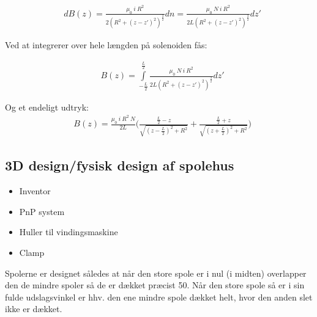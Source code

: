 \begin{align}
	&dB(z)=\frac{\mu_0 \: i \: R^2}{2(R^2+(z-z')^2)^\frac{3}{2}}dn=\frac{\mu_0 \: N \: i \: R^2}{2L(R^2+(z-z')^2)^\frac{3}{2}}dz'
\end{align}

Ved at integrerer over hele længden på solenoiden fås:

\begin{align}
	&B(z)=\int\limits_{-\frac{L}{2}}^{\frac{L}{2}}\frac{\mu_0 \: N \: i \: R^2}{2L(R^2+(z-z')^2)^\frac{3}{2}}dz'
\end{align}

Og et endeligt udtryk:
\begin{align}
	&B(z)= \frac{\mu_0 \: i \: R^2 \: N}{2L}\bigg(\frac{\frac{L}{2}-z}{\sqrt{(z-\frac{L}{2})^2+R^2}}+\frac{\frac{L}{2}+z}{\sqrt{(z+\frac{L}{2})^2+R^2}}\bigg)
\end{align}


%
%
%
%
%
%

\subsection{3D design/fysisk design af spolehus}
\begin{itemize}
	\item Inventor
	\item PnP system
	\item Huller til vindingsmaskine
	\item Clamp
\end{itemize}
Spolerne er designet således at når den store spole er i nul (i midten) overlapper den de mindre spoler så de er dækket præcist 50\percent. Når den store spole så er i sin fulde udslagsvinkel er hhv. den ene mindre spole dækket helt, hvor den anden slet ikke er dækket. \\

